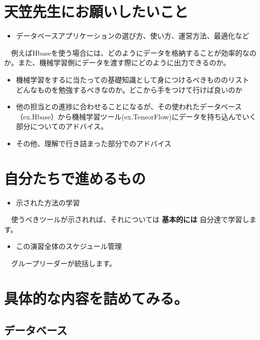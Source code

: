 \documentclass{scrartcl}
\begin{document}
\section{天笠先生にお願いしたいこと}
\label{sec:org8b9066c}
\begin{itemize}
\item データベースアプリケーションの選び方、使い方、運営方法、最適化など\\
\end{itemize}
　例えばHbaseを使う場合には、どのようにデータを格納することが効率的なのか。また、機械学習側にデータを渡す際にどのように出力できるのか。\\
\begin{itemize}
\item 機械学習をするに当たっての基礎知識として身につけるべきもののリスト\\
どんなものを勉強するべきなのか。どこから手をつけて行けば良いのか\\
\item 他の担当との進捗に合わせることになるが、その使われたデータベース（ex.Hbase）から機械学習ツール(ex.TensorFlow)にデータを持ち込んでいく部分についてのアドバイス。\\
\item その他、理解で行き詰まった部分でのアドバイス\\
\end{itemize}
\section{自分たちで進めるもの}
\label{sec:org566e75a}
\begin{itemize}
\item 示された方法の学習\\
\end{itemize}
　使うべきツールが示されれば、それについては \textbf{基本的には} 自分達で学習します。\\
\begin{itemize}
\item この演習全体のスケジュール管理\\
\end{itemize}
　グループリーダーが統括します。\\
\section{具体的な内容を詰めてみる。}
\label{sec:orgca34913}
\subsection{データベース}
\label{sec:orgd03fb9e}
\end{document}

